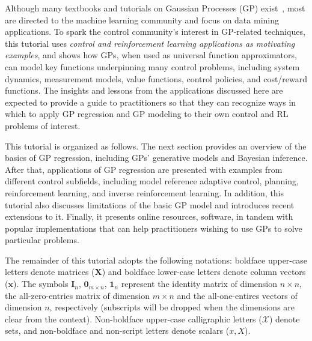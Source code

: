 \documentclass[letterpaper,12pt,peerreviewca,draftcls]{IEEEtran}
\newcommand{\XX}[1]{{\bf \color{orange}{ XX #1 XX}}}
\begin{document}
Although many textbooks and tutorials on Gaussian Processes (GP) exist~\cite{mackay2003information, Rasmussen:2005, Bishop:2006, murphy2012machine,scholkopf2002learning,gelman2014bayesian}, most are directed to the machine learning community and focus on data mining applications. 
To spark the control community's interest in GP-related techniques, this tutorial uses \emph{control and reinforcement learning applications as motivating examples}, 
and shows how GPs, when used as universal function approximators, can model key functions underpinning many control problems, including system dynamics, measurement models, value functions, control policies, and cost/reward functions. %
 The insights and lessons from the applications discussed here are expected to provide a guide to practitioners so that they can recognize ways in which to apply GP regression and GP modeling to their own control and RL problems of interest. 

This tutorial is organized as follows. %
The next section provides an overview of the basics of GP regression, including GPs' generative models and Bayesian inference. After that, applications of GP regression are presented with examples from different control subfields, including model reference adaptive control, planning, reinforcement learning, and inverse reinforcement learning. %
In addition, this tutorial also discusses limitations of the basic GP model and introduces recent extensions to it. Finally, it presents online resources, software, in tandem with popular implementations that can help practitioners wishing to use GPs to solve particular problems.
 
The remainder of this tutorial adopts the following notations: boldface upper-case letters denote matrices ($\bm{X}$) and boldface lower-case letters denote column vectors ($\bm{x}$). The symbols $\bm{I}_n$, $\bm{0}_{m\times n}$, $\bm{1}_n$ represent the identity matrix of dimension $n\times n$, the all-zero-entries matrix of dimension $m\times n$ and the all-one-entires vectors of dimension $n$, respectively (subscripts will be dropped when the dimensions are clear from the context). Non-boldface upper-case calligraphic letters ($\mathcal{X}$) denote sets, and non-boldface and non-script letters denote scalars ($x, X$).
    
\end{document}

